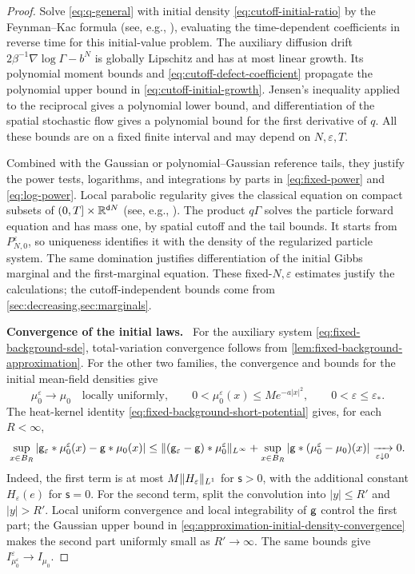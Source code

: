 \documentclass[11pt,reqno]{amsart}
\numberwithin{equation}{section}
\theoremstyle{plain}
\theoremstyle{remark}
\DeclarePairedDelimiter{\norm}{\lVert}{\rVert}
\renewcommand{\d}{\mathsf{d}}\newcommand{\s}{\mathsf{s}}
\newcommand{\parheading}[1]{\par\medskip\noindent\textbf{#1}\ }
\begin{document}
\begin{proof}
Solve \eqref{eq:q-general} with initial density \eqref{eq:cutoff-initial-ratio} by the Feynman--Kac formula (see, e.g., \cite[Section~8.2]{Oksendal}), evaluating the time-dependent coefficients in reverse time for this initial-value problem. The auxiliary diffusion drift $2\beta^{-1}\nabla\log\Gamma-b^N$ is globally Lipschitz and has at most linear growth. Its polynomial moment bounds and \eqref{eq:cutoff-defect-coefficient} propagate the polynomial upper bound in \eqref{eq:cutoff-initial-growth}. Jensen's inequality applied to the reciprocal gives a polynomial lower bound, and differentiation of the spatial stochastic flow gives a polynomial bound for the first derivative of $q$. All these bounds are on a fixed finite interval and may depend on $N,\varepsilon,T$.

Combined with the Gaussian or polynomial--Gaussian reference tails, they justify the power tests, logarithms, and integrations by parts in \eqref{eq:fixed-power} and \eqref{eq:log-power}. Local parabolic regularity gives the classical equation on compact subsets of $(0,T]\times\R^{\d N}$ (see, e.g., \cite[Chapter~5]{Lunardi}). The product $q\Gamma$ solves the particle forward equation and has mass one, by spatial cutoff and the tail bounds. It starts from $P_{N,0}^\varepsilon$, so uniqueness identifies it with the density of the regularized particle system. The same domination justifies differentiation of the initial Gibbs marginal and the first-marginal equation. These fixed-$N,\varepsilon$ estimates justify the calculations; the cutoff-independent bounds come from \cref{sec:decreasing,sec:marginals}.

\parheading{Convergence of the initial laws.}
For the auxiliary system \eqref{eq:fixed-background-sde}, total-variation convergence follows from \cref{lem:fixed-background-approximation}. For the other two families, the convergence and bounds for the initial mean-field densities give
\begin{equation}\label{eq:approximation-initial-density-convergence}
 \mu_0^\varepsilon\longrightarrow\mu_0\quad\text{locally uniformly},
 \qquad 0<\mu_0^\varepsilon(x)\le M e^{-a|x|^2},
 \qquad 0<\varepsilon\le\varepsilon_*.
\end{equation}
The heat-kernel identity \eqref{eq:fixed-background-short-potential} gives, for each $R<\infty$,
\begin{equation}
 \sup_{x\in B_R}|\g_\varepsilon*\mu_0^\varepsilon(x)-\g*\mu_0(x)| \le \norm{(\g_\varepsilon-\g)*\mu_0^\varepsilon}_{L^\infty} +\sup_{x\in B_R}|\g*(\mu_0^\varepsilon-\mu_0)(x)| \xrightarrow[\varepsilon\downarrow0]{}0. \label{eq:approximation-initial-potential-convergence}
\end{equation}
Indeed, the first term is at most $M\norm{H_\varepsilon}_{L^1}$ for $\s>0$, with the additional constant $H_\varepsilon(e)$ for $\s=0$. For the second term, split the convolution into $|y|\le R'$ and $|y|>R'$. Local uniform convergence and local integrability of $\mathsf g$ control the first part; the Gaussian upper bound in \eqref{eq:approximation-initial-density-convergence} makes the second part uniformly small as $R'\to\infty$. The same bounds give $I_{\mu_0^\varepsilon}^\varepsilon\to I_{\mu_0}$.


\end{proof}
\end{document}
